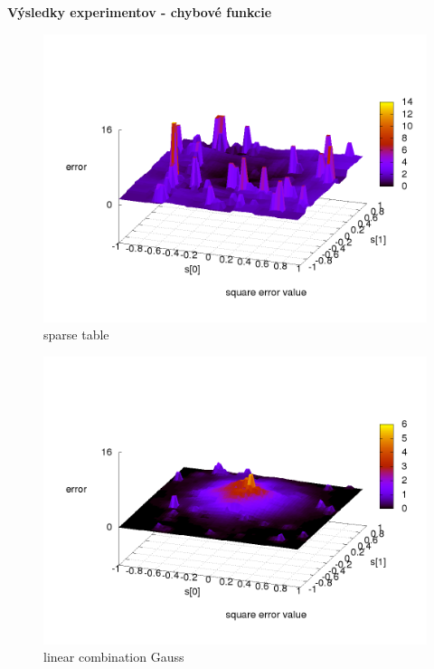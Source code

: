 \documentclass[xcolor=dvipsnames]{beamer}
\begin{document}
\begin{frame}{\bf Výsledky experimentov - chybové funkcie}

\begin{minipage}{.5\textwidth}

\begin{figure}[!htb]
\centering
\includegraphics[scale=.2]{../../results_q_learning/map_1/function_type_1/q_learning_error.png}
\caption{sparse table}
\end{figure}

\end{minipage}%
\begin{minipage}{.5\textwidth}

\begin{figure}[!htb]
\centering
\includegraphics[scale=.2]{../../results_q_learning/map_1/function_type_2/q_learning_error.png}
\caption{linear combination Gauss}
\end{figure}


\end{minipage}
\end{frame}
\end{document}
